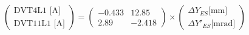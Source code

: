 \documentclass[11pt,letter,english]{article}
\begin{document}
\begin{equation}
\left( \begin{array}{c}
\mbox{DVT4L1 [A]}   \\
\mbox{DVT11L1 [A]}  \end{array} \right) 
=
\left( \begin{array}{cc}
-0.433  & 12.85  \\                 
  2.89  & -2.418 \end{array} \right)
\times
\left( \begin{array}{c}
\Delta Y_{ES}  \mbox{[mm]}   \\
\Delta Y'_{ES} \mbox{[mrad]} \end{array} \right) 
\end{equation}
\end{document}

